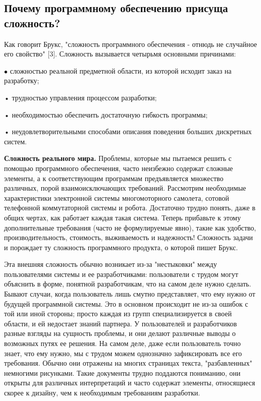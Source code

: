 \documentclass[a4paper,12pt]{article}
\newcommand\tab[1][1cm]{\hspace*{#1}}
\begin{document}
\subsection{Почему программному обеспечению присуща сложность?}
\begin{small}
\parindent=1.25cm
\hspace{1.25 cm}Как говорит Брукс, "сложность программного обеспечения - отнюдь не случайное его свойство" [3]. Сложность вызывается четырьмя основными причинами: \par
$\bullet$ \tab сложностью реальной предметной области, из которой исходит заказ на разработку;\par
•	\tab трудностью управления процессом разработки;\par
•	\tab необходимостью обеспечить достаточную гибкость программы;\par
•	\tab неудовлетворительными способами описания поведения больших дискретных систем.\par
\textbf{Сложность реального мира.} Проблемы, которые мы пытаемся решить с помощью программного обеспечения, часто неизбежно содержат сложные элементы, а к соответствующим программам предъявляется множество различных, порой взаимоисключающих требований. Рассмотрим необходимые характеристики электронной системы многомоторного самолета, сотовой телефонной коммутаторной системы и робота. Достаточно трудно понять, даже в общих чертах, как работает каждая такая система. Теперь прибавьте к этому дополнительные требования (часто не формулируемые явно), такие как удобство, производительность, стоимость, выживаемость и надежность! Сложность задачи и порождает ту сложность программного продукта, о которой пишет Брукс.\par \medskip
Эта внешняя сложность обычно возникает из-за "нестыковки" между пользователями системы и ее разработчиками: пользователи с трудом могут объяснить в форме, понятной разработчикам, что на самом деле нужно сделать. Бывают случаи, когда пользователь лишь смутно представляет, что ему нужно от будущей программной системы. Это в основном происходит не из-за ошибок с той или иной стороны; просто каждая из групп специализируется в своей области, и ей недостает знаний партнера. У пользователей и разработчиков разные взгляды на сущность проблемы, и они делают различные выводы о возможных путях ее решения. На самом деле, даже если пользователь точно знает, что ему нужно, мы с трудом можем однозначно зафиксировать все его требования. Обычно они отражены на многих страницах текста, "разбавленных" немногими рисунками. Такие документы трудно поддаются пониманию, они открыты для различных интерпретаций и часто содержат элементы, относящиеся скорее к дизайну, чем к необходимым требованиям разработки.\par \medskip

\end{small}
\end{document}

